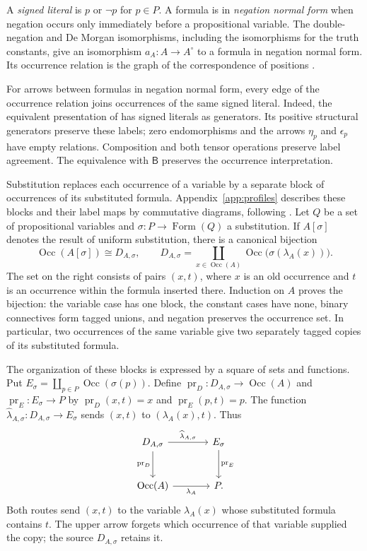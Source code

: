 \documentclass[11pt]{article}
\newcommand{\B}{\mathsf B}
\newcommand{\Occ}{\operatorname{Occ}}
\newcommand{\FormulaSet}{\operatorname{Form}}
\begin{document}
A \emph{signed literal} is $p$ or $\neg p$ for $p\in P$.
A formula is in \emph{negation normal form} when negation occurs only
immediately before a propositional variable. The double-negation and
De Morgan isomorphisms, including the isomorphisms for the truth
constants, give an isomorphism $a_A:A\to A^\circ$ to a formula in
negation normal form. Its occurrence relation is the graph of the
correspondence of positions \cite[\S14.1, pp.~313--315]{DP}.

For arrows between formulas in negation normal form, every edge of
the occurrence relation joins occurrences of the same signed literal.
Indeed, the equivalent presentation of \cite[\S14.2, pp.~318--321]{DP}
has signed literals as generators. Its positive structural generators
preserve these labels; zero endomorphisms and the arrows $\eta_p$ and
$\epsilon_p$ have empty relations. Composition and both tensor
operations preserve label agreement. The equivalence with $\B$ preserves the occurrence
interpretation.

Substitution replaces each occurrence of a variable by a separate
block of occurrences of its substituted formula.
Appendix~\ref{app:profiles} describes these blocks and their label maps
by commutative diagrams, following \cite[\S9]{Notation}.
Let $Q$ be a set of propositional variables and
$\sigma:P\to\FormulaSet(Q)$ a substitution. If $A[\sigma]$ denotes the
result of uniform substitution, there is a canonical bijection
\begin{equation}
 \Occ(A[\sigma])\cong D_{A,\sigma},\qquad
 D_{A,\sigma}=\coprod_{x\in\Occ(A)}
                  \Occ\bigl(\sigma(\lambda_A(x))\bigr).
 \label{eq:occ-substitution}
\end{equation}
The set on the right consists of pairs $(x,t)$, where $x$ is an old
occurrence and $t$ is an occurrence within the formula inserted there.
Induction on $A$ proves the bijection: the variable case has one
block, the constant cases have none, binary connectives form tagged
unions, and negation preserves the occurrence set. In particular,
two occurrences of the same variable give two separately tagged
copies of its substituted formula.

The organization of these blocks is expressed by a square of sets and
functions. Put $E_\sigma=\coprod_{p\in P}\Occ(\sigma(p))$.
Define $\operatorname{pr}_D:D_{A,\sigma}\to\Occ(A)$ and
$\operatorname{pr}_E:E_\sigma\to P$ by
$\operatorname{pr}_D(x,t)=x$ and $\operatorname{pr}_E(p,t)=p$.
The function
$\widehat\lambda_{A,\sigma}:D_{A,\sigma}\to E_\sigma$ sends
$(x,t)$ to $(\lambda_A(x),t)$. Thus
\begin{equation}
\begin{tikzcd}[column sep=large,row sep=large]
 D_{A,\sigma}\arrow[r,"\widehat\lambda_{A,\sigma}"]
   \arrow[d,"\operatorname{pr}_D"']
   &E_\sigma\arrow[d,"\operatorname{pr}_E"]\\
 \Occ(A)\arrow[r,"\lambda_A"']&P.
\end{tikzcd}
\label{eq:block-square}
\end{equation}
Both routes send $(x,t)$ to the variable $\lambda_A(x)$ whose
substituted formula contains $t$. The upper arrow forgets which
occurrence of that variable supplied the copy; the source $D_{A,\sigma}$
retains it.
\end{document}

